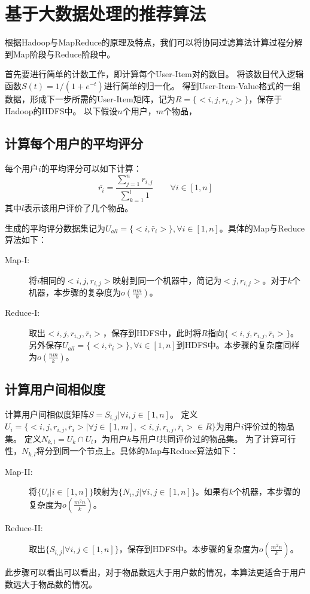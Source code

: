 \section{基于大数据处理的推荐算法}
根据Hadoop与MapReduce的原理及特点，我们可以将协同过滤算法计算过程分解到Map阶段与Reduce阶段中。

首先要进行简单的计数工作，即计算每个User-Item对的数目。
将该数目代入逻辑函数$S(t)=1/(1+e^{-t})$进行简单的归一化。
得到User-Item-Value格式的一组数据，形成下一步所需的User-Item矩阵，记为$R=\{<i,j,r_{i,j}>\}$，保存于Hadoop的HDFS中。
以下假设$n$个用户，$m$个物品，

\subsection{计算每个用户的平均评分}
每个用户$i$的平均评分可以如下计算：
\[
\bar{r_i} = \frac{\sum_{j=1}^n r_{i,j}}{\sum_{k=1}^l 1}\qquad \forall i\in [1,n]
\]
其中$l$表示该用户评价了几个物品。

生成的平均评分数据集记为$U_{all}=\{<i,\bar{r}_i>\},\forall i\in [1,n]$。具体的Map与Reduce算法如下：
\begin{description}
\item[Map-I:] 将$i$相同的$<i,j,r_{i,j}>$映射到同一个机器中，简记为$<j,r_{i,j}>$。对于$k$个机器，本步骤的复杂度为$o(\frac{nm}{k})$。
\item[Reduce-I:] 取出$<i,j,r_{i,j},\bar{r}_i>$，保存到HDFS中，此时将$R$指向$\{<i,j,r_{i,j},\bar{r}_i>\}$。另外保存$U_{all}=\{<i,\bar{r}_i>\},\forall i\in [1,n]$到HDFS中。本步骤的复杂度同样为$o(\frac{nm}{k})$。
\end{description}

\subsection{计算用户间相似度}
计算用户间相似度矩阵$S={S_{i,j}|\forall i,j\in[1,n]}$。
定义$U_i = \{<i,j,r_{i,j},\bar{r}_i>|\forall j \in [1,m],<i,j,r_{i,j},\bar{r}_i>\in R\}$为用户$i$评价过的物品集。
定义$N_{k,l} = U_k \cap U_l$，为用户$k$与用户$l$共同评价过的物品集。
为了计算可行性，$N_{k,l}$将分到同一个节点上。具体的Map与Reduce算法如下：
\begin{description}
\item[Map-II:] 将$\{U_i|i\in [1,n]\}$映射为$\{N_i,j|\forall i,j\in [1,n]\}$。如果有$k$个机器，本步骤的复杂度为$o(\frac{m^2n}{k})$。
\item[Reduce-II:] 取出$\{S_{i,j}|\forall i,j\in [1,n]\}$，保存到HDFS中。本步骤的复杂度为$o(\frac{m^2n}{k})$。
\end{description}
此步骤可以看出可以看出，对于物品数远大于用户数的情况，本算法更适合于用户数远大于物品数的情况。

